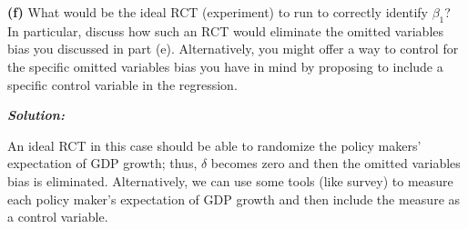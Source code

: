 \documentclass[12pt, letterpaper]{article}
\begin{document}
\vspace{1em}
\noindent\textbf{(f)} What would be the ideal RCT (experiment) to run to correctly identify $\beta_1$? In particular, discuss how such an RCT would eliminate the omitted variables bias you discussed in part (e). Alternatively, you might offer a way to control for the specific omitted variables bias you have in mind by proposing to include a specific control variable in the regression.

\begin{shaded}
\noindent\textbf{\textit{Solution:}}\par
An ideal RCT in this case should be able to randomize the policy makers' expectation of GDP growth; thus, $\delta$ becomes zero and then the omitted variables bias is eliminated. Alternatively, we can use some tools (like survey) to measure each policy maker's expectation of GDP growth and then include the measure as a control variable.
\end{shaded}




\newpage
\printbibliography[
    heading=bibintoc,
    title={Reference}
]
\end{document}
